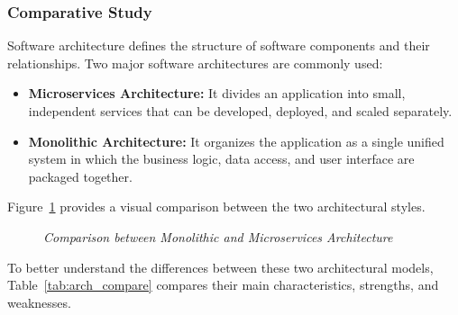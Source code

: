 \subsubsection{Comparative Study}
Software architecture defines the structure of software components and
their relationships. Two major software architectures are commonly used:

\begin{itemize}
	\item \textbf{Microservices Architecture:} It divides an application
	into small, independent services that can be developed,
	deployed, and scaled separately.
	\item \textbf{Monolithic Architecture:} It organizes the application
	as a single unified system in which the business logic, data
	access, and user interface are packaged together.
\end{itemize}

Figure~\ref{fig:arch_compare_img} provides a visual comparison between the two architectural styles.

\begin{figure}[H]
	\centering
	\caption{\textit{Comparison between Monolithic and Microservices Architecture}}
	\label{fig:arch_compare_img}
\end{figure}

To better understand the differences between these two architectural
models, Table~\ref{tab:arch_compare} compares their main characteristics, strengths, and
weaknesses.

